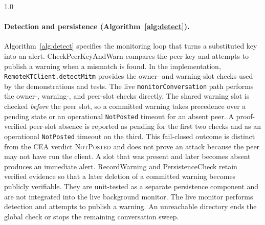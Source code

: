 \begin{spacing}{1.0}
\clearpage
\paragraph{Detection and persistence (Algorithm~\ref{alg:detect}).} Algorithm~\ref{alg:detect} specifies
the monitoring loop that turns a substituted key into an alert. \textsf{CheckPeerKeyAndWarn} compares
the peer key and attempts to publish a warning when a mismatch is found. In the implementation,
\texttt{RemoteKTClient.detectMitm} provides the owner- and warning-slot checks used by the
demonstrations and tests. The live \texttt{monitorConversation} path performs the owner-, warning-, and
peer-slot checks directly.
The shared warning slot is checked \emph{before} the peer slot, so a committed warning takes precedence
over a pending state or an operational \texttt{NotPosted} timeout for an absent peer. A proof-verified
peer-slot absence is reported as pending for the first two checks and as an operational
\texttt{NotPosted} timeout on the third. This fail-closed outcome is distinct from the CEA verdict
\textsc{NotPosted} and does not prove an attack because the peer may not have run the client. A slot
that was present and later becomes absent produces an immediate alert.
\textsf{RecordWarning} and \textsf{PersistenceCheck} retain verified evidence so that a later
deletion of a committed warning becomes publicly verifiable. They are unit-tested as a separate
persistence component and are not integrated into the live background monitor. The live monitor
performs detection and attempts to publish a warning. An unreachable directory ends the global check
or stops the remaining conversation sweep.


\end{spacing}
